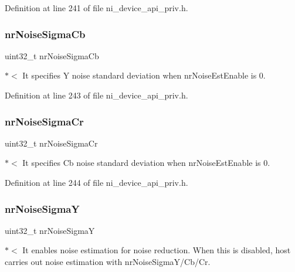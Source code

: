 Definition at line 241 of file ni\+\_\+device\+\_\+api\+\_\+priv.\+h.

\mbox{\label{struct__ni__t408__config__t_a551fcc5ea682e36c1fe82833645cbeba}} 
\subsubsection{\texorpdfstring{nrNoiseSigmaCb}{nrNoiseSigmaCb}}
{\footnotesize\ttfamily uint32\+\_\+t nr\+Noise\+Sigma\+Cb}

$\ast$$<$ It specifies Y noise standard deviation when nr\+Noise\+Est\+Enable is 0. 

Definition at line 243 of file ni\+\_\+device\+\_\+api\+\_\+priv.\+h.

\mbox{\label{struct__ni__t408__config__t_a273b9f2be635c0d0531f0f5cb224bc04}} 
\subsubsection{\texorpdfstring{nrNoiseSigmaCr}{nrNoiseSigmaCr}}
{\footnotesize\ttfamily uint32\+\_\+t nr\+Noise\+Sigma\+Cr}

$\ast$$<$ It specifies Cb noise standard deviation when nr\+Noise\+Est\+Enable is 0. 

Definition at line 244 of file ni\+\_\+device\+\_\+api\+\_\+priv.\+h.

\mbox{\label{struct__ni__t408__config__t_a56f22b5e6fafd5a1e4020b03324ba78d}} 
\subsubsection{\texorpdfstring{nrNoiseSigmaY}{nrNoiseSigmaY}}
{\footnotesize\ttfamily uint32\+\_\+t nr\+Noise\+SigmaY}

$\ast$$<$ It enables noise estimation for noise reduction. When this is disabled, host carries out noise estimation with nr\+Noise\+Sigma\+Y/\+Cb/\+Cr. 

